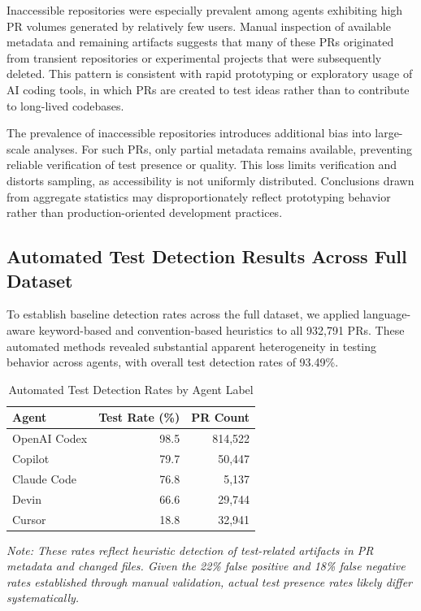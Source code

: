 \documentclass[conference]{IEEEtran}
\begin{document}
Inaccessible repositories were especially prevalent among agents exhibiting high PR volumes generated by relatively few users. Manual inspection of available metadata and remaining artifacts suggests that many of these PRs originated from transient repositories or experimental projects that were subsequently deleted. This pattern is consistent with rapid prototyping or exploratory usage of AI coding tools, in which PRs are created to test ideas rather than to contribute to long-lived codebases.

The prevalence of inaccessible repositories introduces additional bias into large-scale analyses. For such PRs, only partial metadata remains available, preventing reliable verification of test presence or quality. This loss limits verification and distorts sampling, as accessibility is not uniformly distributed. Conclusions drawn from aggregate statistics may disproportionately reflect prototyping behavior rather than production-oriented development practices.

\subsection{Automated Test Detection Results Across Full Dataset}

To establish baseline detection rates across the full dataset, we applied language-aware keyword-based and convention-based heuristics to all 932,791 PRs. These automated methods revealed substantial apparent heterogeneity in testing behavior across agents, with overall test detection rates of 93.49\%.

\begin{table}[t]
\centering
\caption{Automated Test Detection Rates by Agent Label}
\label{tab:automated_rates}
\small
\begin{tabular}{@{}lrr@{}}
\toprule
\textbf{Agent} & \textbf{Test Rate (\%)} & \textbf{PR Count} \\
\midrule
OpenAI Codex & 98.5 & 814,522 \\
Copilot & 79.7 & 50,447 \\
Claude Code & 76.8 & 5,137 \\
Devin & 66.6 & 29,744 \\
Cursor & 18.8 & 32,941 \\
\bottomrule
\end{tabular}
\vspace{0.5em}
\begin{minipage}{\linewidth}
\footnotesize
\textit{Note: These rates reflect heuristic detection of test-related artifacts in PR metadata and changed files. Given the 22\% false positive and 18\% false negative rates established through manual validation, actual test presence rates likely differ systematically.}
\end{minipage}
\end{table}
\end{document}
